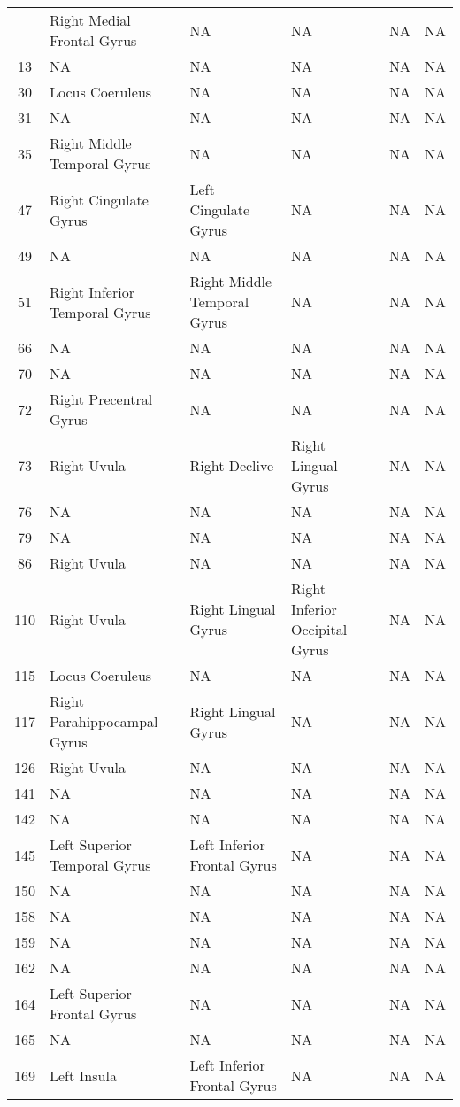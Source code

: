 \documentclass[10pt,letterpaper]{article}\usepackage[]{graphicx}\usepackage[]{color}
\begin{document}
\begin{center}
\begin{longtable}[c]{cP{1.1in}P{1.1in}P{1.1in}cc}
		\bottomrule
		 & Right Medial Frontal Gyrus & NA	& NA & NA & NA \\
		13 & NA	& NA & NA & NA & NA \\
		30 & Locus Coeruleus & NA & NA & NA	& NA \\
		31 & NA	& NA & NA & NA & NA \\
		35 & Right Middle Temporal Gyrus & NA & NA & NA	& NA \\
		47 & Right Cingulate Gyrus & Left Cingulate Gyrus & NA & NA	& NA \\
		49 & NA	& NA & NA & NA & NA \\
		51 & Right Inferior Temporal Gyrus & Right Middle Temporal Gyrus & NA & NA & NA \\
		66 & NA	& NA & NA & NA & NA \\
		70 & NA	& NA & NA & NA & NA \\
		72 & Right Precentral Gyrus	& NA & NA & NA & NA \\
		73 & Right Uvula & Right Declive & Right Lingual Gyrus & NA	& NA \\
		76 & NA	& NA & NA & NA & NA \\
		79 & NA	& NA & NA & NA & NA \\
		86 & Right Uvula & NA & NA & NA	& NA \\
		110	& Right Uvula & Right Lingual Gyrus	& Right Inferior Occipital Gyrus & NA & NA \\
		115	& Locus Coeruleus & NA & NA	& NA & NA \\
		117	& Right Parahippocampal Gyrus & Right Lingual Gyrus	& NA & NA & NA \\
		126	& Right Uvula & NA & NA	& NA & NA \\
		141	& NA & NA & NA & NA	& NA \\
		142	& NA & NA & NA & NA	& NA \\
		145	& Left Superior Temporal Gyrus & Left Inferior Frontal Gyrus & NA & NA & NA \\
		150	& NA & NA & NA & NA	& NA \\
		158	& NA & NA & NA & NA	& NA \\
		159	& NA & NA & NA & NA	& NA \\
		162	& NA & NA & NA & NA	& NA \\
		164	& Left Superior Frontal Gyrus & NA & NA	& NA & NA \\
		165	& NA & NA & NA & NA	& NA \\
		169	& Left Insula & Left Inferior Frontal Gyrus	& NA & NA & NA \\

\end{longtable}
\end{center}
\end{document}
